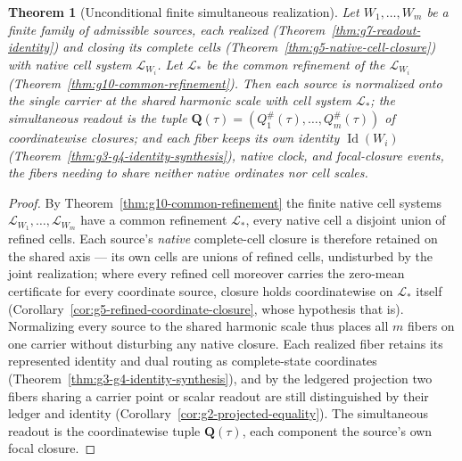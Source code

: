 \documentclass[11pt]{article}
\newtheorem{theorem}{Theorem}
\theoremstyle{definition}
\begin{document}
\begin{theorem}[Unconditional finite simultaneous realization]\label{thm:g10-finite-simultaneous-realization}
Let \(W_1,\ldots,W_m\) be a finite family of admissible sources, each realized
(Theorem~\ref{thm:g7-readout-identity}) and closing its complete cells
(Theorem~\ref{thm:g5-native-cell-closure}) with native cell system
\(\mathcal L_{W_i}\).  Let \(\mathcal L_*\) be the common refinement of the
\(\mathcal L_{W_i}\) (Theorem~\ref{thm:g10-common-refinement}).  Then each source
is normalized onto the single carrier at the shared harmonic scale with cell
system \(\mathcal L_*\); the simultaneous readout is the tuple
\(\mathbf Q(\tau)=(Q_1^\#(\tau),\ldots,Q_m^\#(\tau))\) of coordinatewise
closures; and each fiber keeps its own identity \(\operatorname{Id}(W_i)\)
(Theorem~\ref{thm:g3-g4-identity-synthesis}), native clock, and focal-closure
events, the fibers needing to share neither native ordinates nor cell scales.
\end{theorem}

\begin{proof}
By Theorem~\ref{thm:g10-common-refinement} the finite native cell systems
\(\mathcal L_{W_1},\ldots,\mathcal L_{W_m}\) have a common refinement
\(\mathcal L_*\), every native cell a disjoint union of refined cells.  Each
source's \emph{native} complete-cell closure is therefore retained on the
shared axis --- its own cells are unions of refined cells, undisturbed by the
joint realization; where every refined cell moreover carries the zero-mean
certificate for every coordinate source, closure holds coordinatewise on
\(\mathcal L_*\) itself (Corollary~\ref{cor:g5-refined-coordinate-closure},
whose hypothesis that is).  Normalizing every source to the shared harmonic
scale thus places all \(m\) fibers on one carrier without disturbing any
native closure.  Each realized fiber retains its represented
identity and dual routing as complete-state coordinates
(Theorem~\ref{thm:g3-g4-identity-synthesis}), and by the ledgered projection two
fibers sharing a carrier point or scalar readout are still distinguished by their
ledger and identity (Corollary~\ref{cor:g2-projected-equality}).  The
simultaneous readout is the coordinatewise tuple \(\mathbf Q(\tau)\), each
component the source's own focal closure.
\end{proof}
\end{document}
